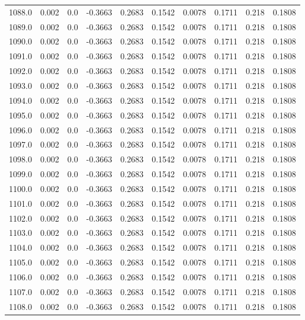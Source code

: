 \begin{longtable}{lrrrrrrrrr}
1088.0 & 0.002 & 0.0 & -0.3663 & 0.2683 & 0.1542 & 0.0078 & 0.1711 & 0.218 & 0.1808 \\
1089.0 & 0.002 & 0.0 & -0.3663 & 0.2683 & 0.1542 & 0.0078 & 0.1711 & 0.218 & 0.1808 \\
1090.0 & 0.002 & 0.0 & -0.3663 & 0.2683 & 0.1542 & 0.0078 & 0.1711 & 0.218 & 0.1808 \\
1091.0 & 0.002 & 0.0 & -0.3663 & 0.2683 & 0.1542 & 0.0078 & 0.1711 & 0.218 & 0.1808 \\
1092.0 & 0.002 & 0.0 & -0.3663 & 0.2683 & 0.1542 & 0.0078 & 0.1711 & 0.218 & 0.1808 \\
1093.0 & 0.002 & 0.0 & -0.3663 & 0.2683 & 0.1542 & 0.0078 & 0.1711 & 0.218 & 0.1808 \\
1094.0 & 0.002 & 0.0 & -0.3663 & 0.2683 & 0.1542 & 0.0078 & 0.1711 & 0.218 & 0.1808 \\
1095.0 & 0.002 & 0.0 & -0.3663 & 0.2683 & 0.1542 & 0.0078 & 0.1711 & 0.218 & 0.1808 \\
1096.0 & 0.002 & 0.0 & -0.3663 & 0.2683 & 0.1542 & 0.0078 & 0.1711 & 0.218 & 0.1808 \\
1097.0 & 0.002 & 0.0 & -0.3663 & 0.2683 & 0.1542 & 0.0078 & 0.1711 & 0.218 & 0.1808 \\
1098.0 & 0.002 & 0.0 & -0.3663 & 0.2683 & 0.1542 & 0.0078 & 0.1711 & 0.218 & 0.1808 \\
1099.0 & 0.002 & 0.0 & -0.3663 & 0.2683 & 0.1542 & 0.0078 & 0.1711 & 0.218 & 0.1808 \\
1100.0 & 0.002 & 0.0 & -0.3663 & 0.2683 & 0.1542 & 0.0078 & 0.1711 & 0.218 & 0.1808 \\
1101.0 & 0.002 & 0.0 & -0.3663 & 0.2683 & 0.1542 & 0.0078 & 0.1711 & 0.218 & 0.1808 \\
1102.0 & 0.002 & 0.0 & -0.3663 & 0.2683 & 0.1542 & 0.0078 & 0.1711 & 0.218 & 0.1808 \\
1103.0 & 0.002 & 0.0 & -0.3663 & 0.2683 & 0.1542 & 0.0078 & 0.1711 & 0.218 & 0.1808 \\
1104.0 & 0.002 & 0.0 & -0.3663 & 0.2683 & 0.1542 & 0.0078 & 0.1711 & 0.218 & 0.1808 \\
1105.0 & 0.002 & 0.0 & -0.3663 & 0.2683 & 0.1542 & 0.0078 & 0.1711 & 0.218 & 0.1808 \\
1106.0 & 0.002 & 0.0 & -0.3663 & 0.2683 & 0.1542 & 0.0078 & 0.1711 & 0.218 & 0.1808 \\
1107.0 & 0.002 & 0.0 & -0.3663 & 0.2683 & 0.1542 & 0.0078 & 0.1711 & 0.218 & 0.1808 \\
1108.0 & 0.002 & 0.0 & -0.3663 & 0.2683 & 0.1542 & 0.0078 & 0.1711 & 0.218 & 0.1808 \\

\end{longtable}
